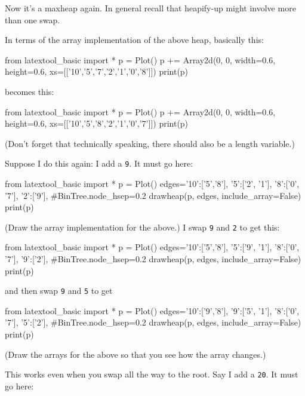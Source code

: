 Now it's a maxheap again.
In general recall that heapify-up might involve
more than one swap.

In terms of the array implementation of the above heap, basically
this:

\begin{python}
from latextool_basic import *
p = Plot()
p += Array2d(0, 0, width=0.6, height=0.6, 
             xs=[['10','5','7','2','1','0','8']])
print(p)
\end{python}

becomes this:

\begin{python}
from latextool_basic import *
p = Plot()
p += Array2d(0, 0, width=0.6, height=0.6, 
             xs=[['10','5','8','2','1','0','7']])
print(p)
\end{python}

(Don't forget that technically speaking, there should also be a
length variable.)

Suppose I do this again: I add a \verb!9!.
It must go here:

\begin{python}
from latextool_basic import *
p = Plot()
edges={'10':['5','8'],
       '5':['2', '1'],
       '8':['0', '7'],
       '2':['9'],
     }
#BinTree.node_hsep=0.2
drawheap(p, edges, include_array=False)
print(p)
\end{python}

(Draw the array implementation for the above.)
I swap \verb!9! and \verb!2! to get this:

\begin{python}
from latextool_basic import *
p = Plot()
edges={'10':['5','8'],
       '5':['9', '1'],
       '8':['0', '7'],
       '9':['2'],
     }
#BinTree.node_hsep=0.2
drawheap(p, edges, include_array=False)
print(p)
\end{python}

and then swap \verb!9! and \verb!5! to get

\begin{python}
from latextool_basic import *
p = Plot()
edges={'10':['9','8'],
       '9':['5', '1'],
       '8':['0', '7'],
       '5':['2'],
     }
#BinTree.node_hsep=0.2
drawheap(p, edges, include_array=False)
print(p)
\end{python}

(Draw the arrays for the above so that you see how the array changes.)

This works even when you swap all the way to the root.
Say I add a \verb!20!.
It must go here:

